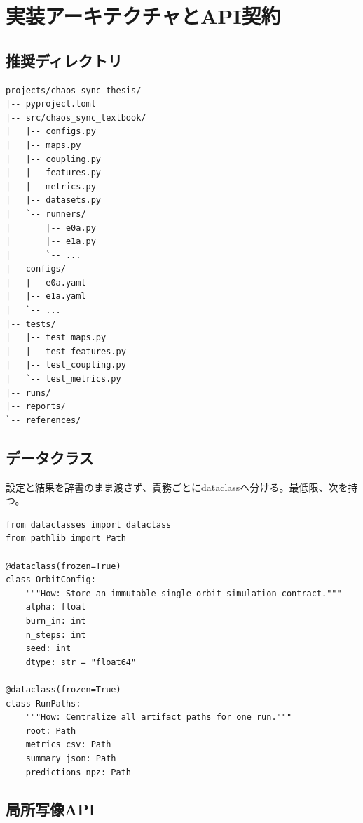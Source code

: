 \documentclass[a4paper,11pt,oneside,openany]{ltjsbook}
\begin{document}
\appendix

\chapter{実装アーキテクチャとAPI契約}
\label{app:architecture}

\section{推奨ディレクトリ}

\begin{Verbatim}[fontsize=\small,frame=single]
projects/chaos-sync-thesis/
|-- pyproject.toml
|-- src/chaos_sync_textbook/
|   |-- configs.py
|   |-- maps.py
|   |-- coupling.py
|   |-- features.py
|   |-- metrics.py
|   |-- datasets.py
|   `-- runners/
|       |-- e0a.py
|       |-- e1a.py
|       `-- ...
|-- configs/
|   |-- e0a.yaml
|   |-- e1a.yaml
|   `-- ...
|-- tests/
|   |-- test_maps.py
|   |-- test_features.py
|   |-- test_coupling.py
|   `-- test_metrics.py
|-- runs/
|-- reports/
`-- references/
\end{Verbatim}

\section{データクラス}

設定と結果を辞書のまま渡さず、責務ごとにdataclassへ分ける。最低限、次を持つ。

\begin{lstlisting}[style=pythonstyle,caption={設定クラスの最小例。}]
from dataclasses import dataclass
from pathlib import Path

@dataclass(frozen=True)
class OrbitConfig:
    """How: Store an immutable single-orbit simulation contract."""
    alpha: float
    burn_in: int
    n_steps: int
    seed: int
    dtype: str = "float64"

@dataclass(frozen=True)
class RunPaths:
    """How: Centralize all artifact paths for one run."""
    root: Path
    metrics_csv: Path
    summary_json: Path
    predictions_npz: Path
\end{lstlisting}

\section{局所写像API}
\end{document}
